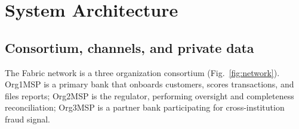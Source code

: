 \documentclass[conference]{IEEEtran}
\begin{document}
\section{System Architecture}

\subsection{Consortium, channels, and private data}

The Fabric network is a three organization consortium (Fig.~\ref{fig:network}).
Org1MSP is a primary bank that onboards customers, scores transactions, and
files reports; Org2MSP is the regulator, performing oversight and completeness
reconciliation; Org3MSP is a partner bank participating for cross-institution
fraud signal.
\end{document}
